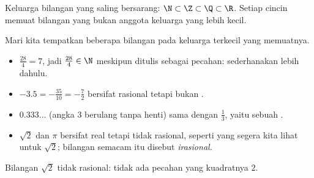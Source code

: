 \begin{omfigure}

{\small Keluarga bilangan yang saling bersarang: $\N \subset \Z \subset \Q \subset
\R$. Setiap cincin memuat bilangan yang bukan anggota keluarga yang lebih kecil.}
\end{omfigure}

\begin{example}\label{ex:g10:numbers:classify}
Mari kita tempatkan beberapa bilangan pada keluarga terkecil yang memuatnya.
\begin{itemize}
  \item $\frac{28}{4} = 7$, jadi $\frac{28}{4} \in \N$ meskipun ditulis
        sebagai pecahan: sederhanakan lebih dahulu.
  \item $-3.5 = -\frac{35}{10} = -\frac72$ bersifat rasional tetapi bukan .
  \item $0.333\dots$ (angka $3$ berulang tanpa henti) sama dengan $\frac13$,
        yaitu sebuah .
  \item $\sqrt 2$ dan $\pi$ bersifat real tetapi tidak rasional, seperti
        yang segera kita lihat untuk $\sqrt 2$; bilangan semacam itu disebut
        \emph{irasional}.
\end{itemize}
\end{example}

\begin{theorem}\label{thm:g10:numbers:sqrt2}
Bilangan $\sqrt 2$ tidak rasional: tidak ada pecahan  yang kuadratnya
$2$.
\end{theorem}

